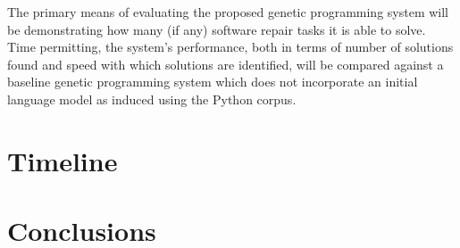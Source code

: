 \documentclass[a4paper,11pt]{proposal}
\begin{document}
The primary means of evaluating the proposed genetic programming system will be demonstrating how many (if any) software repair tasks it is able to solve. Time permitting, the system's performance, both in terms of number of solutions found and speed with which solutions are identified, will be compared against a baseline genetic programming system which does not incorporate an initial language model as induced using the Python corpus.


\section{Timeline}

\section{Conclusions}

\newpage


\end{document}
